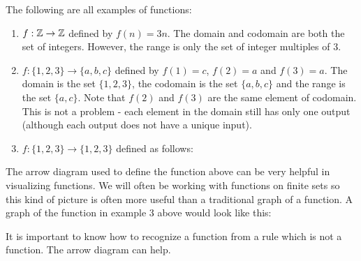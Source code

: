 \documentclass[12pt]{article}
\begin{document}
\begin{example}
  The following are all examples of functions:
  \begin{enumerate}
    \item $f:\mathbb Z \to \mathbb Z$ defined by $f(n) = 3n$.  The domain and codomain are both the set of integers.  However, the range is only the set of integer multiples of 3.
    \item $f: \{1,2,3\} \to \{a,b,c\}$ defined by $f(1) = c$, $f(2) = a$ and $f(3) = a$.  The domain is the set $\{1,2,3\}$, the codomain is the set $\{a,b,c\}$ and the range is the set $\{a,c\}$.  Note that $f(2)$ and $f(3)$ are the same element of codomain.  This is not a problem - each element in the domain still has only one output (although each output does not have a unique input).
    \item $f:\{1,2,3\} \to \{1,2,3\}$ defined as follows:
    \begin{center}

    \end{center}

  \end{enumerate}

\end{example}

The arrow diagram used to define the function above can be very helpful in visualizing functions.  We will often be working with functions on finite sets so this kind of picture is often more useful than a traditional graph of a function.  A graph of the function in example 3 above would look like this:

\begin{center}

\end{center}

It is important to know how to recognize a function from a rule which is not a function.  The arrow diagram can help.
\end{document}
